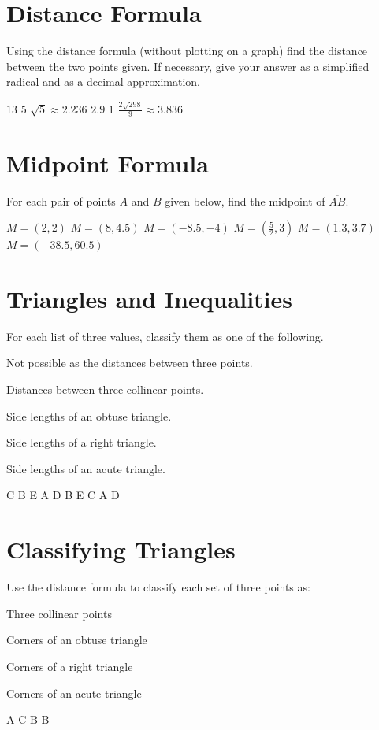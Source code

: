 \section*{Distance Formula}
Using the distance formula (without plotting on a graph) find the distance between the two points given. If necessary, give your answer as a simplified radical and as a decimal approximation.
\begin{smenum}
\mitemxxx
{$13$}
{$5$}
{$\sqrt{5}\approx 2.236$}
\mitemxxx
{$2.9$}
{$1$}
{$\frac{2\sqrt{298}}{9}\approx 3.836$}
\end{smenum}

\section*{Midpoint Formula}
For each pair of points $A$ and $B$ given below, find the midpoint of $\overline{AB}$.
\begin{smenum}
\mitemxxx
{$M=(2,2)$}
{$M=(8,4.5)$}
{$M=(-8.5,-4)$}
\mitemxxx
{$M=\left(\frac{5}{2},3\right)$}
{$M=(1.3,3.7)$}
{$M=(-38.5,60.5)$}
\end{smenum}

\section*{Triangles and Inequalities}
For each list of three values, classify them as one of the following.
\begin{Clist}
\item Not possible as the distances between three points.
\item Distances between three collinear points.
\item Side lengths of an obtuse triangle.
\item Side lengths of a right triangle.
\item Side lengths of an acute triangle.
\end{Clist}
\begin{smenum}
\mitemxxxxx
{C}
{B}
{E}
{A}
{D}
\mitemxxxxx
{B}
{E}
{C}
{A}
{D}
\end{smenum}

\section*{Classifying Triangles}
Use the distance formula to classify each set of three points as:
\begin{Clist}
\item Three collinear points
\item Corners of an obtuse triangle
\item Corners of a right triangle
\item Corners of an acute triangle
\end{Clist}
\begin{smenum}
\mitemxxxx
{A}
{C}
{B}
{B}
\end{smenum}
